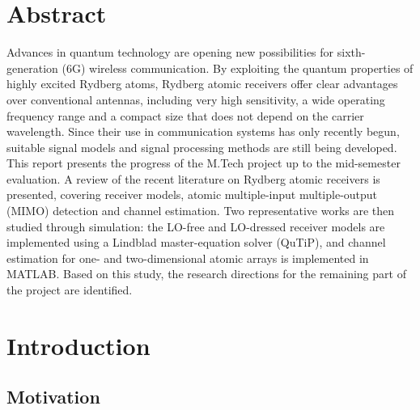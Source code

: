 \documentclass[11pt,a4paper]{article}
\begin{document}

\newpage

\tableofcontents


\newpage

\section*{Abstract}

Advances in quantum technology are opening new possibilities for sixth-generation (6G)
wireless communication. By exploiting the quantum properties of highly excited Rydberg atoms,
Rydberg atomic receivers offer clear advantages over conventional antennas, including very
high sensitivity, a wide operating frequency range and a compact size that does not depend on
the carrier wavelength. Since their use in communication systems has only recently begun,
suitable signal models and signal processing methods are still being developed. This report
presents the progress of the M.Tech project up to the mid-semester evaluation. A review of the
recent literature on Rydberg atomic receivers is presented, covering receiver models, atomic
multiple-input multiple-output (MIMO) detection and channel estimation. Two representative
works are then studied through simulation: the LO-free and LO-dressed receiver models are
implemented using a Lindblad master-equation solver (QuTiP), and channel estimation for one-
and two-dimensional atomic arrays is implemented in MATLAB. Based on this study, the research
directions for the remaining part of the project are identified.


\newpage
\section{Introduction}

\subsection{Motivation}
\end{document}
